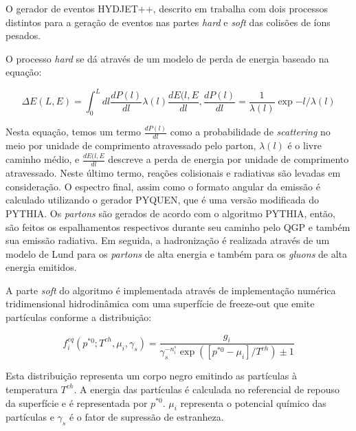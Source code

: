 O gerador de eventos HYDJET++, descrito em \cite{lokhtin_hydjet++_2009} trabalha com dois
processos distintos para a geração de eventos nas partes {\it hard} e {\it soft} das
colisões de íons pesados.
\par
O processo {\it hard} se dá através de um modelo de perda de energia baseado na equação:

\begin{equation}
 \Delta E (L, E) = \int_{0}^{L} dl \frac{dP(l)}{dl} \lambda (l) \frac{dE(l,E}{dl},
 \frac{dP(l)}{dl} = \frac{1}{\lambda (l)} \exp{-l/\lambda (l)}
\end{equation}

Nesta equação, temos um termo $\frac{dP(l)}{dl}$ como a probabilidade de \emph{scattering} no meio
por unidade de comprimento atravessado pelo parton, $\lambda (l)$ é o livre caminho médio, e
$\frac{dE(l,E}{dl}$ descreve a perda de energia por unidade de comprimento atravessado. Neste último
termo, reações colisionais e radiativas são levadas em consideração. O espectro final, assim como o
formato angular da emissão é calculado utilizando o gerador PYQUEN\cite{noauthor_pyquen_nodate}, que é uma versão modificada
do PYTHIA\cite{noauthor_pythia_nodate}. Os \emph{partons} são gerados de acordo com o algoritmo PYTHIA, então, são
feitos os espalhamentos respectivos durante seu caminho pelo QGP e também sua emissão radiativa. Em seguida,
a hadronização é realizada através de um modelo de Lund\cite{skands_introduction_2013} para os \emph{partons} de alta energia e
também para os \emph{gluons} de alta energia emitidos.

\par

A parte \emph{soft} do algoritmo é implementada através de implementação numérica tridimensional hidrodinâmica
com uma superfície de freeze-out que emite partículas conforme a distribuição:

\begin{equation}
 f_{i}^{eq} (p^{*0} ;T^{ch} ,\mu_i , \gamma_s) = \frac{ g_i }{ \gamma_s^{-n_{i}^{s}} \exp{ ( [p^{*0} - \mu_i]/T^{ch} ) } \pm 1 }
\end{equation}

Esta distribuição representa um corpo negro emitindo as partículas à temperatura $T^{ch}$. A energia das partículas é calculada
no referencial de repouso da superfície e é representada por $p^{*0}$. $\mu_i$ representa o potencial químico das partículas e
$\gamma_s$ é o fator de supressão de estranheza.